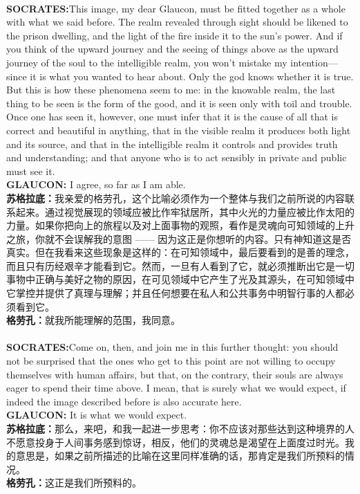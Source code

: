 \documentclass{article}
\begin{document}
\\
\textbf{SOCRATES:}This image, my dear Glaucon, must be fitted together as a whole with what we said before. The realm revealed through sight should be likened to the prison dwelling, and the light of the fire inside it to the sun's power. And if you think of the upward journey and the seeing of things above as the upward journey of the soul to the intelligible realm, you won't mistake my intention—since it is what you wanted to hear about. Only the god knows whether it is true. But this is how these phenomena seem to me: in the knowable realm, the last thing to be seen is the form of the good, and it is seen only with toil and trouble. Once one has seen it, however, one must infer that it is the cause of all that is correct and beautiful in anything, that in the visible realm it produces both light and its source, and that in the intelligible realm it controls and provides truth and understanding; and that anyone who is to act sensibly in private and public must see it.\\
\textbf{GLAUCON: }I agree, so far as I am able.\\
\textbf{苏格拉底：}我亲爱的格劳孔，这个比喻必须作为一个整体与我们之前所说的内容联系起来。通过视觉展现的领域应被比作牢狱居所，其中火光的力量应被比作太阳的力量。如果你把向上的旅程以及对上面事物的观照，看作是灵魂向可知领域的上升之旅，你就不会误解我的意图 —— 因为这正是你想听的内容。只有神知道这是否真实。但在我看来这些现象是这样的：在可知领域中，最后要看到的是善的理念，而且只有历经艰辛才能看到它。然而，一旦有人看到了它，就必须推断出它是一切事物中正确与美好之物的原因，在可见领域中它产生了光及其源头，在可知领域中它掌控并提供了真理与理解；并且任何想要在私人和公共事务中明智行事的人都必须看到它。\\
\textbf{格劳孔：}就我所能理解的范围，我同意。\\

\\
\textbf{SOCRATES:}Come on, then, and join me in this further thought: you should not be surprised that the ones who get to this point are not willing to occupy themselves with human affairs, but that, on the contrary, their souls are always eager to spend their time above. I mean, that is surely what we would expect, if indeed the image described before is also accurate here.\\
\textbf{GLAUCON: }It is what we would expect.\\
\textbf{苏格拉底：}那么，来吧，和我一起进一步思考：你不应该对那些达到这种境界的人不愿意投身于人间事务感到惊讶，相反，他们的灵魂总是渴望在上面度过时光。我的意思是，如果之前所描述的比喻在这里同样准确的话，那肯定是我们所预料的情况。\\
\textbf{格劳孔：}这正是我们所预料的。\\
\end{document}
